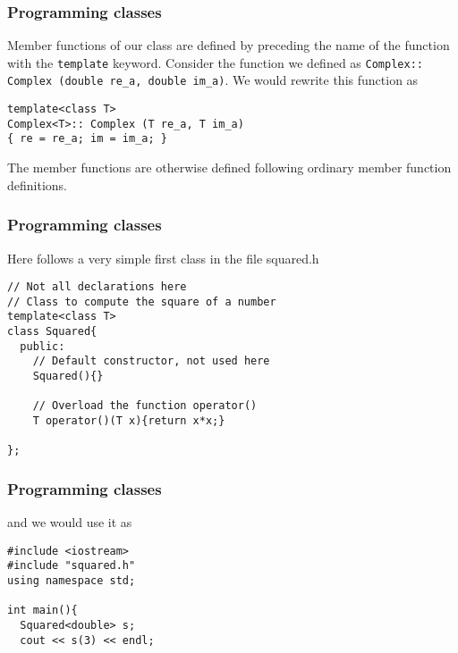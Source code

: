 \documentclass{beamer}
\begin{document}
\begin{frame}
\frametitle{Programming classes}

Member functions of our class are defined by preceding the name of the function with the \Verb!template! keyword.
Consider the function we defined as \Verb!Complex:: Complex (double re_a, double im_a)!.
We would rewrite this function as

\begin{verbatim}
template<class T>
Complex<T>:: Complex (T re_a, T im_a)
{ re = re_a; im = im_a; }
\end{verbatim}
The member functions  are otherwise defined following ordinary member function definitions.
\end{frame}

\begin{frame}
\frametitle{Programming classes}

Here follows a very simple first class in the file squared.h

\begin{verbatim}
// Not all declarations here
// Class to compute the square of a number
template<class T>
class Squared{
  public:
    // Default constructor, not used here
    Squared(){}

    // Overload the function operator()
    T operator()(T x){return x*x;}

};
\end{verbatim}
\end{frame}

\begin{frame}
\frametitle{Programming classes}

and we would use it as

\begin{verbatim}
#include <iostream>
#include "squared.h"
using namespace std;

int main(){
  Squared<double> s;
  cout << s(3) << endl;

\end{verbatim}
\end{frame}
\end{document}
